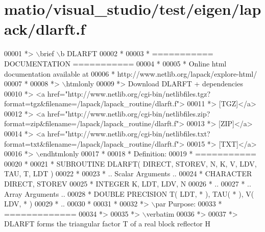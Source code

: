 \hypertarget{matio_2visual__studio_2test_2eigen_2lapack_2dlarft_8f_source}{}\section{matio/visual\+\_\+studio/test/eigen/lapack/dlarft.f}
\label{matio_2visual__studio_2test_2eigen_2lapack_2dlarft_8f_source}

\begin{DoxyCode}
00001 \textcolor{comment}{*> \(\backslash\)brief \(\backslash\)b DLARFT}
00002 \textcolor{comment}{*}
00003 \textcolor{comment}{*  =========== DOCUMENTATION ===========}
00004 \textcolor{comment}{*}
00005 \textcolor{comment}{* Online html documentation available at }
00006 \textcolor{comment}{*            http://www.netlib.org/lapack/explore-html/ }
00007 \textcolor{comment}{*}
00008 \textcolor{comment}{*> \(\backslash\)htmlonly}
00009 \textcolor{comment}{*> Download DLARFT + dependencies }
00010 \textcolor{comment}{*> <a
       href="http://www.netlib.org/cgi-bin/netlibfiles.tgz?format=tgz&filename=/lapack/lapack\_routine/dlarft.f"> }
00011 \textcolor{comment}{*> [TGZ]</a> }
00012 \textcolor{comment}{*> <a
       href="http://www.netlib.org/cgi-bin/netlibfiles.zip?format=zip&filename=/lapack/lapack\_routine/dlarft.f"> }
00013 \textcolor{comment}{*> [ZIP]</a> }
00014 \textcolor{comment}{*> <a
       href="http://www.netlib.org/cgi-bin/netlibfiles.txt?format=txt&filename=/lapack/lapack\_routine/dlarft.f"> }
00015 \textcolor{comment}{*> [TXT]</a>}
00016 \textcolor{comment}{*> \(\backslash\)endhtmlonly }
00017 \textcolor{comment}{*}
00018 \textcolor{comment}{*  Definition:}
00019 \textcolor{comment}{*  ===========}
00020 \textcolor{comment}{*}
00021 \textcolor{comment}{*       SUBROUTINE DLARFT( DIRECT, STOREV, N, K, V, LDV, TAU, T, LDT )}
00022 \textcolor{comment}{* }
00023 \textcolor{comment}{*       .. Scalar Arguments ..}
00024 \textcolor{comment}{*       CHARACTER          DIRECT, STOREV}
00025 \textcolor{comment}{*       INTEGER            K, LDT, LDV, N}
00026 \textcolor{comment}{*       ..}
00027 \textcolor{comment}{*       .. Array Arguments ..}
00028 \textcolor{comment}{*       DOUBLE PRECISION   T( LDT, * ), TAU( * ), V( LDV, * )}
00029 \textcolor{comment}{*       ..}
00030 \textcolor{comment}{*  }
00031 \textcolor{comment}{*}
00032 \textcolor{comment}{*> \(\backslash\)par Purpose:}
00033 \textcolor{comment}{*  =============}
00034 \textcolor{comment}{*>}
00035 \textcolor{comment}{*> \(\backslash\)verbatim}
00036 \textcolor{comment}{*>}
00037 \textcolor{comment}{*> DLARFT forms the triangular factor T of a real block reflector H}

\end{DoxyCode}
